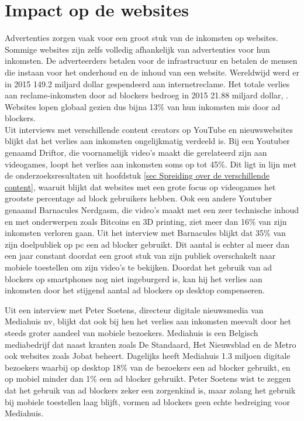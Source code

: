 \documentclass[pdftex,a4paper,12pt,twoside]{report}
\begin{document}
\section{Impact op de websites}
\label{sec:Impact op de webpagina's}
Advertenties zorgen vaak voor een groot stuk van de inkomsten op websites. Sommige websites zijn zelfs volledig afhankelijk van advertenties voor hun inkomsten. De adverteerders betalen voor de infrastructuur en betalen de mensen die instaan voor het onderhoud en de inhoud van een website. Wereldwijd werd er in 2015 149.2 miljard dollar gespendeerd aan internetreclame. Het totale verlies aan reclame-inkomsten door ad blockers bedroeg in 2015 21.88 miljard dollar, \cite{PageFair2015}. Websites lopen globaal gezien dus bijna 13\% van hun inkomsten mis door ad blockers. 
\\
Uit interviews met verschillende content creators op YouTube en nieuwswebsites blijkt dat het verlies aan inkomsten ongelijkmatig verdeeld is. Bij een Youtuber genaamd Driftor, die voornamelijk video's maakt die gerelateerd zijn aan videogames, loopt het verlies aan inkomsten soms op tot 45\%. Dit ligt in lijn met de onderzoeksresultaten uit hoofdstuk \ref{sec Spreiding over de verschillende content}, waaruit blijkt dat websites met een grote focus op videogames het grootste percentage ad block gebruikers hebben. 
Ook een andere Youtuber genaamd Barnacules Nerdgasm, die video's maakt met een zeer technische inhoud en met onderwerpen zoals Bitcoins en 3D printing, ziet meer dan 16\% van zijn inkomsten verloren gaan. Uit het interview met Barnacules blijkt dat 35\% van zijn doelpubliek op pc een ad blocker gebruikt. Dit aantal  is echter al meer dan een jaar constant doordat een groot stuk van zijn publiek overschakelt naar mobiele toestellen om zijn video's te bekijken. Doordat het gebruik van ad blockers op smartphones nog niet ingeburgerd is, kan hij het verlies aan inkomsten door het stijgend aantal ad blockers op desktop compenseren.

Uit een interview met Peter Soetens, directeur digitale nieuwsmedia van Mediahuis nv, blijkt dat ook bij hen het verlies aan inkomsten meevalt door het steeds groter aandeel van mobiele bezoekers. Mediahuis is een Belgisch mediabedrijf dat naast kranten zoals De Standaard, Het Nieuwsblad en de Metro ook websites zoals Jobat beheert. Dagelijks heeft Mediahuis 1.3 miljoen digitale bezoekers waarbij op desktop 18\% van de bezoekers een ad blocker gebruikt, en op mobiel minder dan 1\% een ad blocker gebruikt. Peter Soetens wist te zeggen dat het gebruik van ad blockers zeker een zorgenkind is, maar zolang het gebruik bij mobiele toestellen laag blijft, vormen ad blockers geen echte bedreiging voor Mediahuis.
\end{document}
